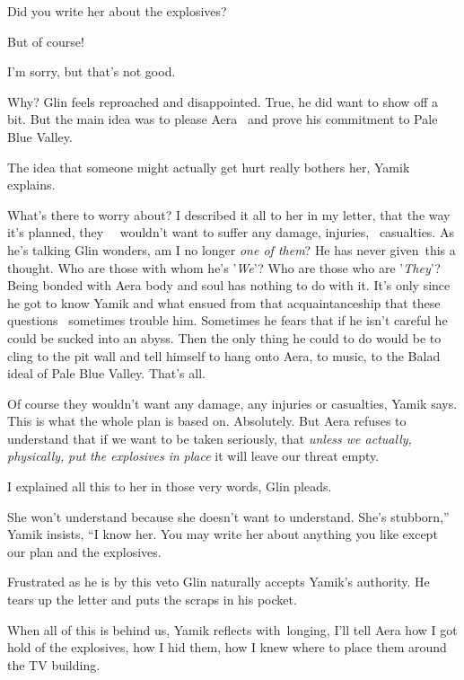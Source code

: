 \documentclass[12pt]{book}
\begin{document}
{\textquotedbl}Did you write her about the explosives?{\textquotedbl}

{\textquotedbl}But of course!{\textquotedbl}~

{\textquotedbl}I'm sorry, but that's not good.{\textquotedbl}

{\textquotedbl}Why?{\textquotedbl} Glin feels reproached and disappointed. True, he did want to show off a bit. But the
main idea was to please Aera \ and prove his commitment to Pale Blue Valley.

{\textquotedbl}The idea that someone might actually get hurt really bothers her,{\textquotedbl} Yamik explains.

{\textquotedbl}What's there to worry about? I described it all to her in my letter, that the way it's planned, they
\ \ wouldn't want to suffer any damage, injuries, \ casualties.{\textquotedbl} As he's talking Glin wonders, am I no
longer \textit{one of them}?{ }He has never given~this a thought. Who are those
with whom he's '\textit{We}{}'? Who are those who are '\textit{They}{}'? Being bonded with Aera body and soul has
nothing to do with it. It's only since he got to know Yamik and what ensued from that acquaintanceship that these
questions \ sometimes trouble him. Sometimes he fears that if he isn't careful he could be sucked into an abyss. Then
the only thing he could to do would be to cling to the pit wall and tell himself to hang onto Aera, to music, to the
Balad ideal of Pale Blue Valley. That's all.

{\textquotedbl}Of course they wouldn't want any damage, any injuries or casualties,{\textquotedbl} Yamik says.
{\textquotedbl}This is what the whole plan is based on. Absolutely. But Aera refuses to understand that if we want to
be taken seriously, that \textit{unless we actually, physically,} \textit{put} \textit{the explosives in} \textit{place
}it will leave our threat empty.{\textquotedbl}

{\textquotedbl}I explained all this to her in those very words,{\textquotedbl} Glin pleads.

{\textquotedbl}She won't understand because she doesn't want to understand. She's stubborn,'' Yamik insists, ``I know
her. You may write her about anything you like except our plan and the explosives.{\textquotedbl}

Frustrated as he is by this veto Glin naturally accepts Yamik's authority. He tears up the letter and puts the scraps in
his pocket.

When all of this is behind us, Yamik reflects with~longing, I'll tell Aera how I got hold of the explosives, how I hid
them, how I knew where to place them around the TV building.
\end{document}
